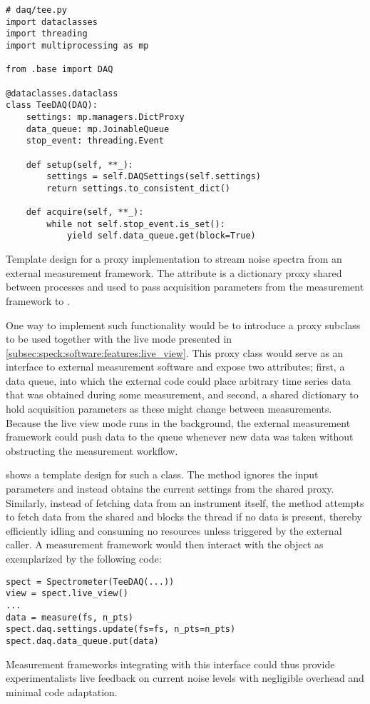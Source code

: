 \begin{marginlisting}
    \begin{verbatim}
# daq/tee.py
import dataclasses
import threading
import multiprocessing as mp

from .base import DAQ

@dataclasses.dataclass
class TeeDAQ(DAQ):
    settings: mp.managers.DictProxy
    data_queue: mp.JoinableQueue
    stop_event: threading.Event

    def setup(self, **_):
        settings = self.DAQSettings(self.settings)
        return settings.to_consistent_dict()

    def acquire(self, **_):
        while not self.stop_event.is_set():
            yield self.data_queue.get(block=True)
    \end{verbatim}
    \caption[ template]{
        Template design for a proxy  implementation to stream noise spectra from an external measurement framework.
        The  attribute is a dictionary proxy shared between processes and used to pass acquisition parameters from the measurement framework to \pyspeck.
    }
    \label{lst:speck:conclusion:tee}
\end{marginlisting}

One way to implement such functionality would be to introduce a proxy  subclass to be used together with the live mode presented in \cref{subsec:speck:software:features:live_view}.
This proxy class would serve as an interface to external measurement software and expose two attributes; first, a data queue, into which the external code could place arbitrary time series data that was obtained during some measurement, and second, a shared dictionary to hold acquisition parameters as these might change between measurements.
Because the live view mode runs in the background, the external measurement framework could push data to the queue whenever new data was taken without obstructing the measurement workflow.

 shows a template design for such a  class.
The  method ignores the input parameters and instead obtains the current settings from the shared  proxy.
Similarly, instead of fetching data from an instrument itself, the  method attempts to fetch data from the shared  and blocks the thread if no data is present, thereby efficiently idling and consuming no resources unless triggered by the external caller.
A measurement framework would then interact with the  object as exemplarized by the following code:
\begin{verbatim}
spect = Spectrometer(TeeDAQ(...))
view = spect.live_view()
...
data = measure(fs, n_pts)
spect.daq.settings.update(fs=fs, n_pts=n_pts)
spect.daq.data_queue.put(data)
\end{verbatim}
Measurement frameworks integrating with this interface could thus provide experimentalists live feedback on current noise levels with negligible overhead and minimal code adaptation.

